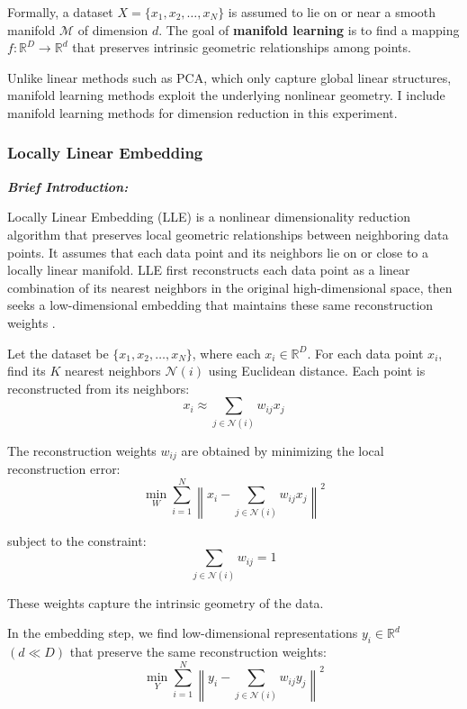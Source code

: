 \documentclass[a4paper,12pt]{article}
\begin{document}
Formally, a dataset $X = \{x_1, x_2, \ldots, x_N\}$ is assumed to lie on or near a smooth manifold $\mathcal{M}$ of dimension $d$. 
The goal of \textbf{manifold learning} is to find a mapping $f: \mathbb{R}^D \to \mathbb{R}^d$ that preserves intrinsic geometric relationships among points.

Unlike linear methods such as PCA, which only capture global linear structures, manifold learning methods exploit the underlying nonlinear geometry. I include manifold learning methods for 
dimension reduction in this experiment.
\subsubsection{Locally Linear Embedding}
\noindent \textit{\textbf{Brief Introduction:}}

Locally Linear Embedding (LLE) is a nonlinear dimensionality reduction algorithm that preserves local geometric relationships between neighboring data points. 
It assumes that each data point and its neighbors lie on or close to a locally linear manifold. 
LLE first reconstructs each data point as a linear combination of its nearest neighbors in the original high-dimensional space, then seeks a low-dimensional embedding that maintains these same reconstruction weights \cite{lle}.

Let the dataset be $\{x_1, x_2, \ldots, x_N\}$, where each $x_i \in \mathbb{R}^D$. 
For each data point $x_i$, find its $K$ nearest neighbors $\mathcal{N}(i)$ using Euclidean distance. 
Each point is reconstructed from its neighbors:
\[
x_i \approx \sum_{j \in \mathcal{N}(i)} w_{ij} x_j
\]

The reconstruction weights $w_{ij}$ are obtained by minimizing the local reconstruction error:
\begin{equation}
\min_{W} \sum_{i=1}^{N} \left\| x_i - \sum_{j \in \mathcal{N}(i)} w_{ij} x_j \right\|^2
\end{equation}

subject to the constraint:
\[
\sum_{j \in \mathcal{N}(i)} w_{ij} = 1
\]

These weights capture the intrinsic geometry of the data.

In the embedding step, we find low-dimensional representations $y_i \in \mathbb{R}^d$ $(d \ll D)$ that preserve the same reconstruction weights:
\begin{equation}
\min_{Y} \sum_{i=1}^{N} \left\| y_i - \sum_{j \in \mathcal{N}(i)} w_{ij} y_j \right\|^2
\end{equation}
\end{document}
